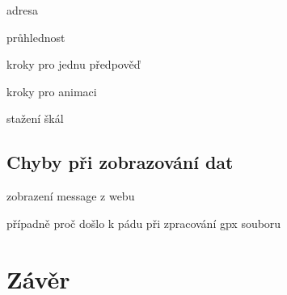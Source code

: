 \documentclass[czech,bachelor,dept460,male,csharp,cpdeclaration]{diploma}
\begin{document}
	adresa
	
	průhlednost
	
	kroky pro jednu předpověď
	
	kroky pro animaci
	
	stažení škál
	
	\subsection{Chyby při zobrazování dat}
	
	zobrazení message z webu
	
	případně proč došlo k pádu při zpracování gpx souboru
	
	\section{Závěr}
	
	\printbibliography[title={Literatura}, heading=bibintoc]

	
\end{document}

